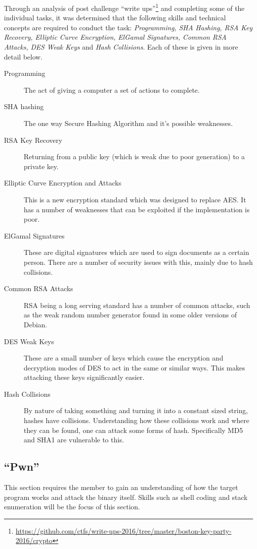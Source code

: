 \documentclass[twoside,a4paper,11pt]{report}
\begin{document}
			Through an analysis of post challenge ``write ups''\footnote{\url{https://github.com/ctfs/write-ups-2016/tree/master/boston-key-party-2016/crypto}}
			and completing some of the individual tasks, 
			it was determined that the following skills and technical concepts are required to conduct the task: 
			\textit{Programming, SHA Hashing, RSA Key Recovery, Elliptic Curve Encryption, ElGamal Signatures, Common RSA Attacks, DES Weak Keys} and \textit{Hash Collisions}.
			Each of these is given in more detail below. 
			\begin{description}
				\item[Programming]
					The act of giving a computer a set of actions to complete. 
				\item[SHA hashing] 
					The one way Secure Hashing Algorithm and it's possible weaknesses. 
				\item[RSA Key Recovery]
					Returning from a public key (which is weak due to poor generation) to a private key. 
				\item[Elliptic Curve Encryption and Attacks]
					This is a new encryption standard which was designed to replace AES. 
					It has a number of weaknesses that can be exploited if the implementation is poor. 
				\item[ElGamal Signatures]
					These are digital signatures which are used to sign documents as a certain person. 
					There are a number of security issues with this, mainly due to hash collisions. 
				\item[Common RSA Attacks] 
					RSA being a long serving standard has a number of common attacks, such as the weak random number generator found in some older versions of Debian. 
				\item[DES Weak Keys] 
					These are a small number of keys which cause the encryption and decryption modes of DES to act in the same or similar ways. 
					This makes attacking these keys significantly easier. 
				\item[Hash Collisions]
					By nature of taking something and turning it into a constant sized string, hashes have collisions. 
					Understanding how these collisions work and where they can be found, one can attack some forms of hash. 
					Specifically MD5 and SHA1 are vulnerable to this. 
			\end{description}
		\subsection{``Pwn''}
			This section requires the member to gain an understanding of how the target program works and attack the binary itself. 
			Skills such as shell coding and stack enumeration will be the focus of this section. 
\end{document}
